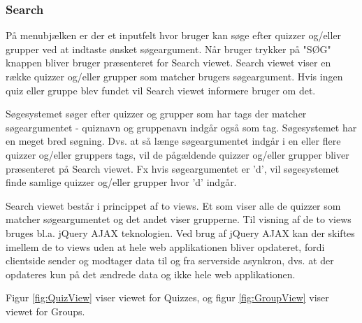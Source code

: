\subsubsection{Search}

På menubjælken er der et inputfelt hvor bruger kan søge efter quizzer og/eller grupper ved at indtaste ønsket søgeargument. Når bruger trykker på "SØG" knappen bliver bruger præsenteret for Search viewet. Search viewet viser en række quizzer og/eller grupper som matcher brugers søgeargument. Hvis ingen quiz eller gruppe blev fundet vil Search viewet informere bruger om det. 

Søgesystemet søger  efter quizzer og grupper som har tags der matcher søgeargumentet - quiznavn og gruppenavn indgår også som tag. Søgesystemet har en meget bred søgning. Dvs. at så længe søgeargumentet indgår i en eller flere quizzer og/eller gruppers tags, vil de pågældende quizzer og/eller grupper bliver præsenteret på Search viewet. Fx hvis søgeargumentet er 'd', vil søgesystemet finde samlige quizzer og/eller grupper hvor 'd' indgår.  


Search viewet består i princippet af to views. Et som viser alle de quizzer som matcher søgeargumentet og det andet viser grupperne. Til visning af de to views bruges bl.a. jQuery AJAX teknologien. Ved brug af jQuery AJAX kan der skiftes imellem de to views uden at hele web applikationen bliver opdateret, fordi clientside sender og modtager data til og fra serverside asynkron, dvs. at der opdateres kun på det ændrede data og ikke hele web applikationen. 

Figur \ref{fig:QuizView} viser viewet for Quizzes, og figur \ref{fig:GroupView} viser viewet for Groups. 


